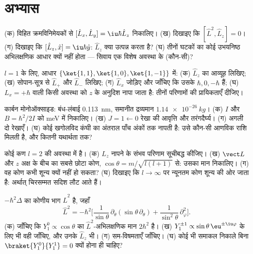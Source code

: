 \section{अभ्यास}

\begin{exercise}[$\star$]\label{exo:b3:quantum-angular-momentum:1}
(क) विहित क्रमविनिमेयकों से $[\hat L_x, \hat L_y] = \iu\hbar\hat L_z$
निकालिए। (ख) दिखाइए कि $[\hat L^2, \hat L_z] = 0$। (ग) दिखाइए कि
$[\hat L_z, \hat x] = \iu\hbar\hat y$: $\hat L_z$ क्या
उत्पन्न करता है? (घ) तीनों घटकों का कोई उभयनिष्ठ अभिलक्षणिक आधार क्यों
नहीं होता --- सिवाय एक विशेष अवस्था के (कौन-सी)?
\end{exercise}

\begin{exercise}[$\star$]\label{exo:b3:quantum-angular-momentum:2}
$l = 1$ के लिए, आधार $\{\ket{1,1}, \ket{1,0}, \ket{1,-1}\}$ में:
(क) $\hat L_z$ का आव्यूह लिखिए; (ख) सोपान-सूत्र से
$\hat L_+$ और $\hat L_-$ लिखिए; (ग) $\hat L_x$ जोड़िए और जाँचिए कि
उसके  $\hbar, 0, -\hbar$ हैं; (घ) $L_x =
+\hbar$ वाली किसी अवस्था को $z$ के अनुदिश नापा जाता है: तीनों
परिणामों की प्रायिकताएँ दीजिए।
\end{exercise}

\begin{exercise}[$\star$]\label{exo:b3:quantum-angular-momentum:3}
कार्बन मोनोऑक्साइड: बंध-लंबाई \qty{0.113}{nm}, समानीत द्रव्यमान
$\qty{1.14e-26}{kg}$। (क) $I$ और $B = \hbar^2/2I$ को \unit{meV} में निकालिए।
(ख) $J = 1 \leftarrow 0$ रेखा की आवृत्ति और तरंगदैर्घ्य।
(ग) अगली दो रेखाएँ। (घ) कोई खगोलविद कंघी का अंतराल
पाँच अंकों तक नापती है: उसे कौन-सी आणविक राशि मिलती है, और कितनी
यथार्थता तक?
\end{exercise}

\begin{exercise}[$\star$]\label{exo:b3:quantum-angular-momentum:4}
कोई कण $l = 2$ की अवस्था में है। (क) $L_z$ नापने के संभव परिणाम
सूचीबद्ध कीजिए। (ख) $\vect L$ और $z$ अक्ष के बीच का सबसे छोटा कोण,
$\cos\theta = m/\sqrt{l(l+1)}$ से: उसका मान निकालिए। (ग) वह कोण
कभी शून्य क्यों नहीं हो सकता? (घ) दिखाइए कि $l \to \infty$ पर न्यूनतम
कोण शून्य की ओर जाता है: अर्थात् चिरसम्मत सदिश लौट आते हैं।
\end{exercise}

\begin{exercise}[$\star\star$]\label{exo:b3:quantum-angular-momentum:5}
$-\hbar^2\Delta$ का कोणीय भाग $\hat L^2$ है, जहाँ
\[
\hat L^2 = -\hbar^2\Big[\frac{1}{\sin\theta}\,\partial_\theta
(\sin\theta\,\partial_\theta) +
\frac{1}{\sin^2\theta}\,\partial_\varphi^2\Big] .
\]
(क) जाँचिए कि $Y_1^0 \propto \cos\theta$ का $\hat L^2$-अभिलक्षणिक मान
$2\hbar^2$ है। (ख) $Y_1^{\pm1} \propto \sin\theta\,
\eu^{\pm\iu\varphi}$ के लिए भी वही जाँचिए, और उनके $\hat L_z$
 भी। (ग)
सम-विषमताएँ जाँचिए। (घ) कोई भी समाकल निकाले बिना
$\braket{Y_1^0}{Y_1^1} = 0$ क्यों होना ही चाहिए?
\end{exercise}

